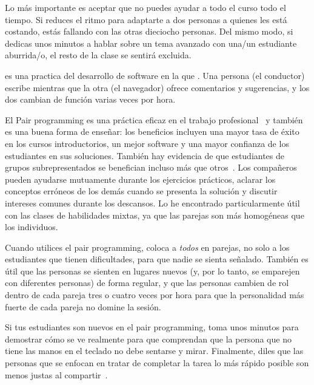 Lo más importante es aceptar que
no puedes ayudar a todo el curso todo el tiempo.
Si reduces el ritmo para adaptarte a dos personas a quienes les está costando,
estás fallando con las otras dieciocho personas.
Del mismo modo,
si dedicas unos minutos a hablar sobre un tema avanzado con una/un estudiante aburrida/o,
el resto de la clase se sentirá excluida.


 es una practica del desarrollo de software
en la que .
Una persona (el conductor) escribe
mientras que la otra (el navegador) ofrece comentarios y sugerencias,
y los dos cambian de función varias veces por hora.

El Pair programming es una práctica eficaz en el trabajo profesional~\cite{Hann2009}
y también es una buena forma de enseñar:
los beneficios incluyen una mayor tasa de éxito en los cursos introductorios,
un mejor software
y una mayor confianza de los estudiantes en sus soluciones.
También hay evidencia de que estudiantes de grupos subrepresentados
se benefician incluso más que otros~\cite{McDo2006,Hank2011,Port2013,Cele2018}.
Los compañeros pueden ayudarse mutuamente durante los ejercicios prácticos,
aclarar los conceptos erróneos de los demás cuando se presenta la solución
y discutir intereses comunes durante los descansos.
Lo he encontrado particularmente útil con las clases de habilidades mixtas,
ya que las parejas son más homogéneas que los individuos.

Cuando utilices el pair programming,
coloca a \emph{todos} en parejas,
no solo a los estudiantes que tienen dificultades,
para que nadie se sienta señalado.
También es útil que las personas se sienten en lugares nuevos
(y, por lo tanto, se emparejen con diferentes personas)
de forma regular,
y que las personas cambien de rol dentro de cada pareja tres o cuatro veces por hora
para que la personalidad más fuerte de cada pareja no domine la sesión.

Si tus estudiantes son nuevos en el pair programming,
toma unos minutos para demostrar cómo se ve realmente
para que comprendan que
la persona que no tiene las manos en el teclado
no debe sentarse y mirar.
Finalmente,
diles que las personas que se enfocan en tratar de completar la tarea lo más rápido posible
son menos justas al compartir~\cite{Lewi2015}.

